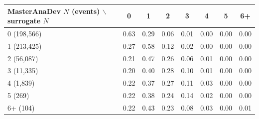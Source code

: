 \begin{tabular}{lccccccc}
\toprule
MasterAnaDev $N$ (events) $\backslash$ surrogate $N$ & 0 & 1 & 2 & 3 & 4 & 5 & 6+ \\
\midrule
0 (198,566) & 0.63 & 0.29 & 0.06 & 0.01 & 0.00 & 0.00 & 0.00 \\
1 (213,425) & 0.27 & 0.58 & 0.12 & 0.02 & 0.00 & 0.00 & 0.00 \\
2 (56,087) & 0.21 & 0.47 & 0.26 & 0.06 & 0.01 & 0.00 & 0.00 \\
3 (11,335) & 0.20 & 0.40 & 0.28 & 0.10 & 0.01 & 0.00 & 0.00 \\
4 (1,839) & 0.22 & 0.37 & 0.27 & 0.11 & 0.03 & 0.00 & 0.00 \\
5 (269) & 0.22 & 0.38 & 0.24 & 0.14 & 0.02 & 0.00 & 0.00 \\
6+ (104) & 0.22 & 0.43 & 0.23 & 0.08 & 0.03 & 0.00 & 0.01 \\
\bottomrule
\end{tabular}
